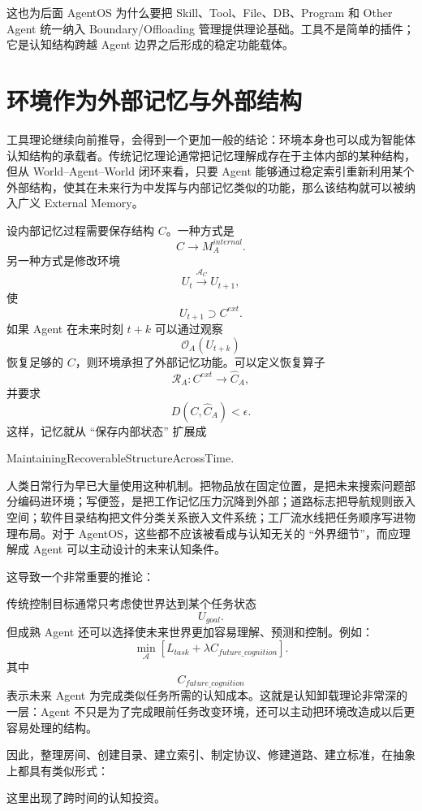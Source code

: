 这也为后面 AgentOS 为什么要把 Skill、Tool、File、DB、Program 和 Other Agent 统一纳入 Boundary/Offloading 管理提供理论基础。工具不是简单的插件；它是认知结构跨越 Agent 边界之后形成的稳定功能载体。


\section{环境作为外部记忆与外部结构}

工具理论继续向前推导，会得到一个更加一般的结论：环境本身也可以成为智能体认知结构的承载者。传统记忆理论通常把记忆理解成存在于主体内部的某种结构，但从 World--Agent--World 闭环来看，只要 Agent 能够通过稳定索引重新利用某个外部结构，使其在未来行为中发挥与内部记忆类似的功能，那么该结构就可以被纳入广义 External Memory。

设内部记忆过程需要保存结构 $C$。一种方式是
\[
C
\rightarrow
M_A^{internal}.
\]
另一种方式是修改环境
\[
U_t
\xrightarrow{\mathcal A_C}
U_{t+1},
\]
使
\[
U_{t+1}
\supset
C^{ext}.
\]
如果 Agent 在未来时刻 $t+k$ 可以通过观察
\[
\mathcal O_A(U_{t+k})
\]
恢复足够的 $C$，则环境承担了外部记忆功能。可以定义恢复算子
\[
\mathcal R_A:
C^{ext}
\rightarrow
\hat C_A,
\]
并要求
\[
D(C,\hat C_A)
<
\epsilon.
\]
这样，记忆就从 ``保存内部状态'' 扩展成
\begin{statementbox}
MaintainingRecoverableStructureAcrossTime.
\end{statementbox}

人类日常行为早已大量使用这种机制。把物品放在固定位置，是把未来搜索问题部分编码进环境；写便签，是把工作记忆压力沉降到外部；道路标志把导航规则嵌入空间；软件目录结构把文件分类关系嵌入文件系统；工厂流水线把任务顺序写进物理布局。对于 AgentOS，这些都不应该被看成与认知无关的 ``外界细节''，而应理解成 Agent 可以主动设计的未来认知条件。

这导致一个非常重要的推论：
\begin{statementbox}
\centering
{}
\end{statementbox}
传统控制目标通常只考虑使世界达到某个任务状态
\[
U_{goal}.
\]
但成熟 Agent 还可以选择使未来世界更加容易理解、预测和控制。例如：
\[
\min_{\mathcal A}
\left[
L_{task}
+
\lambda C_{future\_cognition}
\right].
\]
其中
\[
C_{future\_cognition}
\]
表示未来 Agent 为完成类似任务所需的认知成本。这就是认知卸载理论非常深的一层：Agent 不只是为了完成眼前任务改变环境，还可以主动把环境改造成以后更容易处理的结构。

因此，整理房间、创建目录、建立索引、制定协议、修建道路、建立标准，在抽象上都具有类似形式：
\begin{statementbox}
\centering
{}
\end{statementbox}
这里出现了跨时间的认知投资。

